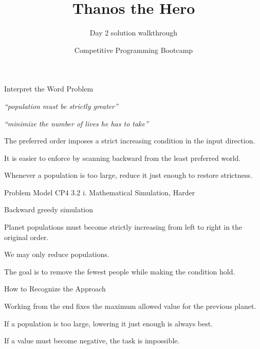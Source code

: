 \documentclass[aspectratio=169,11pt]{beamer}
\title[thanosthehero]{Thanos the Hero}
\subtitle{Day 2 solution walkthrough}
\author[Solution Deck]{Competitive Programming Bootcamp}
\date{}
\begin{document}
\begin{frame}[plain]
  \titlepage
\end{frame}

\begin{frame}{Interpret the Word Problem}
\small
{}
\begin{tightitemize}
  \item \textit{``population must be strictly greater''}
  \item \textit{``minimize the number of lives he has to take''}
\end{tightitemize}

\vspace{0.18cm}
\begin{tightitemize}
  \item The preferred order imposes a strict increasing condition in the input direction.
  \item It is easier to enforce by scanning backward from the least preferred world.
  \item Whenever a population is too large, reduce it just enough to restore strictness.
\end{tightitemize}
\end{frame}







\begin{frame}{Problem Model}
\small
{} CP4 3.2 i. Mathematical Simulation, Harder

\vspace{0.25cm}
 Backward greedy simulation

\vspace{0.25cm}
\begin{tightitemize}
  \item Planet populations must become strictly increasing from left to right in the original order.
  \item We may only reduce populations.
  \item The goal is to remove the fewest people while making the condition hold.
\end{tightitemize}
\end{frame}

\begin{frame}{How to Recognize the Approach}
\begin{tightitemize}
  \item Working from the end fixes the maximum allowed value for the previous planet.
  \item If a population is too large, lowering it just enough is always best.
  \item If a value must become negative, the task is impossible.
\end{tightitemize}
\end{frame}
\end{document}
